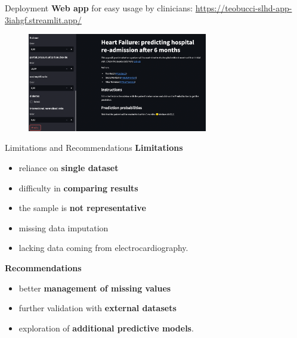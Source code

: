 \documentclass[aspectratio=169,xcolor=dvipsnames,handout]{beamer}
\begin{document}
\begin{frame}{Deployment}
    \textbf{Web app} for easy usage by clinicians:
    {\scriptsize\url{https://teobucci-slhd-app-3iahgf.streamlit.app/}}
    \begin{figure}[htpb]
        \centering
        \includegraphics[width=0.7\textwidth]{webapp}
    \end{figure}
\end{frame}



\begin{frame}{Limitations and Recommendations}
\textbf{Limitations}
\begin{itemize}
  \item reliance on \textbf{single dataset}
  \item difficulty in \textbf{comparing results}
  \item the sample is \textbf{not representative}
  \item missing data imputation
  \item lacking data coming from electrocardiography.
\end{itemize}
\pause
\textbf{Recommendations}
\begin{itemize}
  \item better \textbf{management of missing values}
  \item further validation with \textbf{external datasets}
  \item exploration of \textbf{additional predictive models}.
\end{itemize}
\end{frame}
\end{document}

